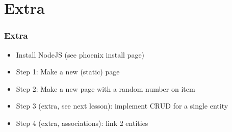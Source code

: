 \section{Extra}

\frame{\tableofcontents[currentsection]}

\begin{frame}
    \frametitle{Extra}

    \begin{itemize}
        \item Install NodeJS (see phoenix install page)
        \item Step 1: Make a new (static) page
        \item Step 2: Make a new page with a random number on item
        \item Step 3 (extra, see next lesson): implement CRUD for a single entity
        \item Step 4 (extra, associations): link 2 entities 
    \end{itemize}
    

\end{frame}
